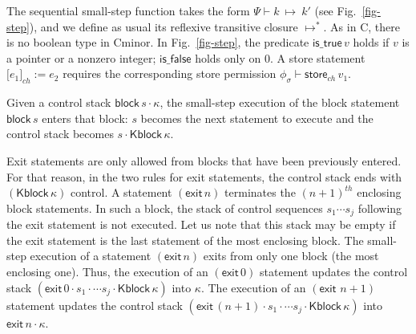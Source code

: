 \documentclass{llncs}
\newcommand{\cminor}{Cminor}
\newcommand{\tyface}[1]{\ensuremath{\mathsf{#1}}}
\newcommand{\Sstore}[3]{\tyface{[}#2\tyface{]}_{#1}\tyface{:=}#3}
\newcommand{\Sblock}[1]{\tyface{block}\,#1}
\newcommand{\Sexit}[1]{\tyface{exit}\,#1}
\newcommand{\Kseq}[2]{#1\cdot #2}
\newcommand{\Kblock}[1]{\tyface{Kblock\,#1}}
\newcommand{\ctl}{\kappa} \newcommand{\stmt}{\tyface{stmt}}
\newcommand{\fmap}{\Psi}
\newcommand{\infootprint}[4]{#4 \vdash \tyface{#3}_#2\, #1}
\newcommand{\step}[2]{\fmap \vdash #1\:\longmapsto\:#2}
\begin{document}
The sequential small-step function takes the
form $\step{k}{k'}$ (see Fig.~\ref{fig-step}),
and we define as usual its 
reflexive transitive closure $\longmapsto^{*}$.
As in C, there is no boolean type in \cminor.
In Fig.~\ref{fig-step}, the predicate $\tyface{is\_true}\,v$ 
holds if $v$ is a pointer or a nonzero integer; 
$ \tyface{is\_false}$ holds only on 0.
A store statement $\Sstore{\mathit{ch}}{e_1}{e_2}$ requires the corresponding 
store permission $\infootprint{v_1}{\mathit{ch}}{store}{\phi_\sigma} $.

Given a control stack $\Kseq {\Sblock s}\ctl$, the small-step execution of the block 
statement $\Sblock s$ enters that block: $s$ becomes the next statement to execute and the
control stack becomes ${\Kseq{s}{\Kblock\ctl}}$.

Exit statements are only allowed from blocks that have been previously entered.
For that reason, in the two rules for exit statements, the control stack ends with
$(\Kblock \ctl)$ control.
A statement $(\Sexit n)$ terminates the $(n+1)^{th}$ enclosing block statements.
In such a block, the stack of control sequences ${s_1}\cdots{s_j}$ following the
exit statement is not executed. 
Let us note that this stack may be empty if the exit statement is the last statement
of the most enclosing block.
The small-step execution of a statement $(\Sexit n)$
exits from only one block (the most enclosing one).
Thus, the execution of an $(\Sexit 0)$ statement updates the control stack
$(\Kseq{\Sexit{0}}{\Kseq{s_1}{\cdots\Kseq{s_j}{\Kblock{\ctl}}}})$ into $\ctl$.
The execution of an $(\Sexit {\,n+1})$ statement updates the control stack
$(\Kseq{\Sexit{(n+1)}}{\Kseq{s_1}{\cdots\Kseq{s_j}{\Kblock{\ctl}}}})$ into $\Kseq{\Sexit n}\ctl$.
\end{document}
